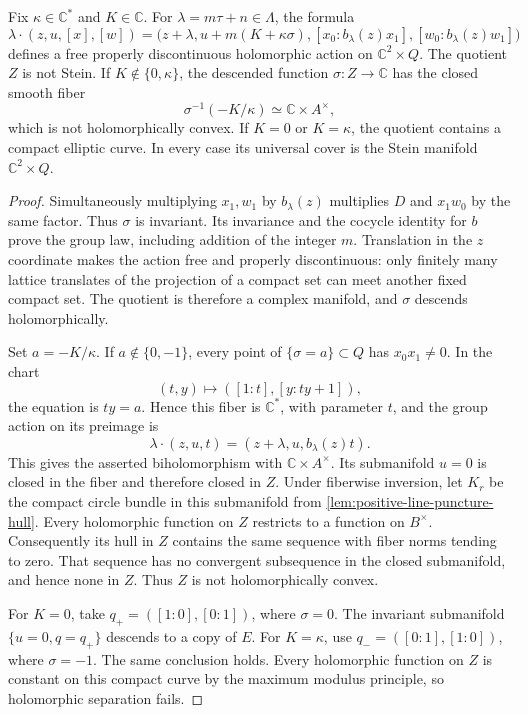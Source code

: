 \begin{proposition}\label{prop:elliptic-affine-quotient-nonstein}
Fix $\kappa\in\mathbb C^*$ and $K\in\mathbb C$. For $\lambda=m\tau+n\in\Lambda$, the formula
\[
 \lambda\cdot(z,u,[x],[w])=
 \bigl(z+\lambda,u+m(K+\kappa\sigma),
       [x_0:b_\lambda(z)x_1],[w_0:b_\lambda(z)w_1]\bigr)
\]
defines a free properly discontinuous holomorphic action on $\mathbb C^2\times Q$. The quotient $Z$ is not Stein. If $K\notin\{0,\kappa\}$, the descended function $\sigma:Z\to\mathbb C$ has the closed smooth fiber
\[
 \sigma^{-1}(-K/\kappa)\simeq\mathbb C\times A^\times,
\]
which is not holomorphically convex. If $K=0$ or $K=\kappa$, the quotient contains a compact elliptic curve. In every case its universal cover is the Stein manifold $\mathbb C^2\times Q$.
\end{proposition}
\begin{proof}
Simultaneously multiplying $x_1,w_1$ by $b_\lambda(z)$ multiplies $D$ and $x_1w_0$ by the same factor. Thus $\sigma$ is invariant. Its invariance and the cocycle identity for $b$ prove the group law, including addition of the integer $m$. Translation in the $z$ coordinate makes the action free and properly discontinuous: only finitely many lattice translates of the projection of a compact set can meet another fixed compact set. The quotient is therefore a complex manifold, and $\sigma$ descends holomorphically.

Set $a=-K/\kappa$. If $a\notin\{0,-1\}$, every point of $\{\sigma=a\}\subset Q$ has $x_0x_1\ne0$. In the chart
\[
 (t,y)\longmapsto([1:t],[y:ty+1]),
\]
the equation is $ty=a$. Hence this fiber is $\mathbb C^*$, with parameter $t$, and the group action on its preimage is
\[
 \lambda\cdot(z,u,t)=(z+\lambda,u,b_\lambda(z)t).
\]
This gives the asserted biholomorphism with $\mathbb C\times A^\times$. Its submanifold $u=0$ is closed in the fiber and therefore closed in $Z$. Under fiberwise inversion, let $K_r$ be the compact circle bundle in this submanifold from \cref{lem:positive-line-puncture-hull}. Every holomorphic function on $Z$ restricts to a function on $B^\times$. Consequently its hull in $Z$ contains the same sequence with fiber norms tending to zero. That sequence has no convergent subsequence in the closed submanifold, and hence none in $Z$. Thus $Z$ is not holomorphically convex.

For $K=0$, take $q_+=([1:0],[0:1])$, where $\sigma=0$. The invariant submanifold $\{u=0,q=q_+\}$ descends to a copy of $E$. For $K=\kappa$, use $q_-=([0:1],[1:0])$, where $\sigma=-1$. The same conclusion holds. Every holomorphic function on $Z$ is constant on this compact curve by the maximum modulus principle, so holomorphic separation fails.


\end{proof}
